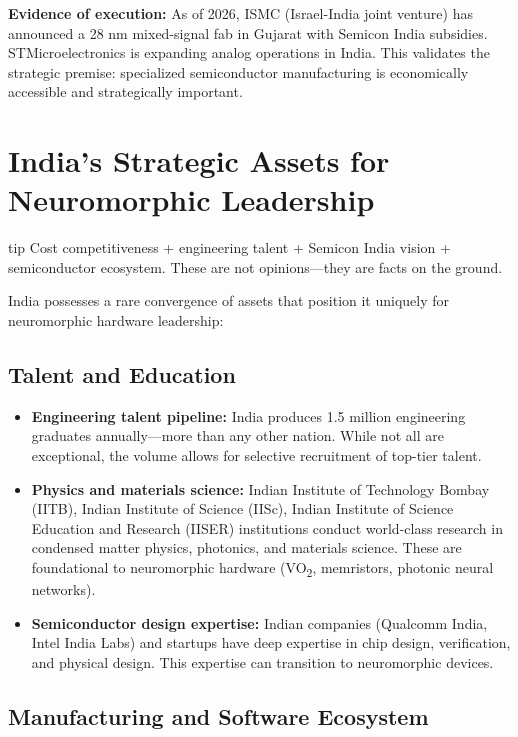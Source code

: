 \textbf{Evidence of execution:} As of 2026, ISMC (Israel-India joint venture) has announced a 28 nm mixed-signal fab in Gujarat with Semicon India subsidies. STMicroelectronics is expanding analog operations in India. This validates the strategic premise: specialized semiconductor manufacturing is economically accessible and strategically important.

\section{India's Strategic Assets for Neuromorphic Leadership}
\begin{block}{tip}
Cost competitiveness + engineering talent + Semicon India vision + semiconductor ecosystem. These are not opinions—they are facts on the ground.
\end{block}


India possesses a rare convergence of assets that position it uniquely for neuromorphic hardware leadership:

\subsection{Talent and Education}

\begin{itemize}
\item \textbf{Engineering talent pipeline:} India produces 1.5 million engineering graduates annually---more than any other nation. While not all are exceptional, the volume allows for selective recruitment of top-tier talent.
\item \textbf{Physics and materials science:} Indian Institute of Technology Bombay (IITB), Indian Institute of Science (IISc), Indian Institute of Science Education and Research (IISER) institutions conduct world-class research in condensed matter physics, photonics, and materials science. These are foundational to neuromorphic hardware (VO\textsubscript{2}, memristors, photonic neural networks).
\item \textbf{Semiconductor design expertise:} Indian companies (Qualcomm India, Intel India Labs) and startups have deep expertise in chip design, verification, and physical design. This expertise can transition to neuromorphic devices.
\end{itemize}

\subsection{Manufacturing and Software Ecosystem}

